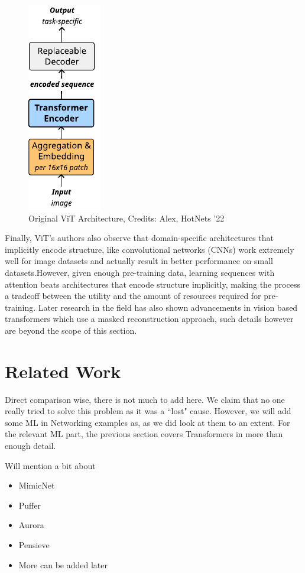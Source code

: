 \begin{figure}[!hbt]
  \begin{center}
    \includegraphics[scale=1.5]{figures/architecture_vit.pdf}
    \caption{Original ViT Architecture, Credits: Alex, HotNets '22}
    \label{fig:vit}
  \end{center}
\end{figure}


Finally, ViT's authors also observe that domain-specific architectures that implicitly encode structure, like convolutional networks (CNNs) work extremely well for image datasets and  actually result in better performance on small datasets.However, given enough pre-training data, learning sequences with attention beats architectures that encode structure implicitly, making the process a tradeoff between the utility and the amount of resources required for pre-training. Later research in the field has also shown advancements in vision based transformers which use a masked reconstruction approach\cite{heMaskedAutoencodersAre2021}, such details however are beyond the scope of this section. 


\section{Related Work}
\label{sec:related_work}

Direct comparison wise, there is not much to add here. We claim that no one really tried to solve this problem as it was a ``lost" cause. However, we will add some ML in Networking examples as, as we did look at them to an extent. For the relevant ML part, the previous section covers Transformers in more than enough detail.

Will mention a bit about 
\begin{itemize}
\item MimicNet\cite{zhangMimicNetFastPerformance2021}
\item Puffer\cite{puffer} 
\item Aurora\cite{jayDeepReinforcementLearning2019}
\item Pensieve\cite{maoNeuralAdaptiveVideo2017}
\item More can be added later  
\end{itemize}



